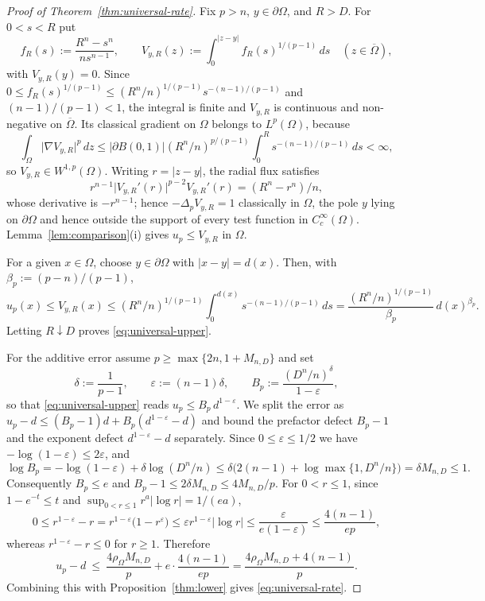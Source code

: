 \documentclass[11pt]{article}
\newcommand{\abs}[1]{\lvert #1\rvert}
\theoremstyle{definition}
\theoremstyle{remark}
\begin{document}
\begin{proof}[Proof of Theorem~\ref{thm:universal-rate}]
Fix $p>n$, $y\in\partial\Omega$, and $R>D$. For $0<s<R$ put
\[
f_R(s):=\frac{R^n-s^n}{n s^{n-1}},
\qquad
V_{y,R}(z):=\int_0^{\abs{z-y}}f_R(s)^{1/(p-1)}\,ds
\quad(z\in\overline\Omega),
\]
with $V_{y,R}(y)=0$. Since
$0\le f_R(s)^{1/(p-1)}\le (R^n/n)^{1/(p-1)}s^{-(n-1)/(p-1)}$ and
$(n-1)/(p-1)<1$, the integral is finite and $V_{y,R}$ is continuous and
non-negative on $\overline\Omega$. Its classical gradient on $\Omega$ belongs
to $L^p(\Omega)$, because
\[
\int_\Omega\abs{\nabla V_{y,R}}^p\,dz
\le \abs{\partial B(0,1)}(R^n/n)^{p/(p-1)}
\int_0^R s^{-(n-1)/(p-1)}\,ds<\infty,
\]
so $V_{y,R}\in W^{1,p}(\Omega)$. Writing $r=\abs{z-y}$, the radial flux
satisfies
\[
r^{n-1}\abs{V_{y,R}'(r)}^{p-2}V_{y,R}'(r)=(R^n-r^n)/n,
\]
whose
derivative is $-r^{n-1}$; hence $-\Delta_pV_{y,R}=1$ classically in $\Omega$,
the pole $y$ lying on $\partial\Omega$ and hence outside the support of every
test function in $C_c^\infty(\Omega)$. Lemma~\ref{lem:comparison}(i) gives
$u_p\le V_{y,R}$ in $\Omega$.

For a given $x\in\Omega$, choose $y\in\partial\Omega$ with
$\abs{x-y}=d(x)$. Then, with $\beta_p:=(p-n)/(p-1)$,
\[
u_p(x)\le V_{y,R}(x)
\le (R^n/n)^{1/(p-1)}\int_0^{d(x)}s^{-(n-1)/(p-1)}\,ds
=\frac{(R^n/n)^{1/(p-1)}}{\beta_p}\,d(x)^{\beta_p}.
\]
Letting $R\downarrow D$ proves \eqref{eq:universal-upper}.

For the additive error assume $p\ge\max\{2n,1+M_{n,D}\}$ and set
\[
\delta:=\frac1{p-1},\qquad \varepsilon:=(n-1)\delta,
\qquad B_p:=\frac{(D^n/n)^\delta}{1-\varepsilon},
\]
so that \eqref{eq:universal-upper} reads $u_p\le B_p\,d^{1-\varepsilon}$. We
split the error as $u_p-d\le(B_p-1)d+B_p(d^{1-\varepsilon}-d)$ and bound the
prefactor defect $B_p-1$ and the exponent defect $d^{1-\varepsilon}-d$
separately. Since $0\le\varepsilon\le1/2$ we have $-\log(1-\varepsilon)\le2\varepsilon$, and
\[
\log B_p
=-\log(1-\varepsilon)+\delta\log(D^n/n)
\le\delta\bigl(2(n-1)+\log\max\{1,D^n/n\}\bigr)=\delta M_{n,D}\le1 .
\]
Consequently $B_p\le e$ and $B_p-1\le2\delta M_{n,D}\le4M_{n,D}/p$. For
$0<r\le1$, since $1-e^{-t}\le t$ and $\sup_{0<r\le1}r^{a}\abs{\log r}=1/(ea)$,
\[
0\le r^{1-\varepsilon}-r
=r^{1-\varepsilon}\bigl(1-r^{\varepsilon}\bigr)
\le\varepsilon r^{1-\varepsilon}\abs{\log r}
\le\frac{\varepsilon}{e(1-\varepsilon)}
\le\frac{4(n-1)}{ep},
\]
whereas $r^{1-\varepsilon}-r\le0$ for $r\ge1$. Therefore
\[
u_p-d\ \le\ \frac{4\rho_\Omega M_{n,D}}{p}+e\cdot\frac{4(n-1)}{ep}
=\frac{4\rho_\Omega M_{n,D}+4(n-1)}{p}.
\]
Combining this with Proposition~\ref{thm:lower} gives
\eqref{eq:universal-rate}.
\end{proof}
\end{document}
